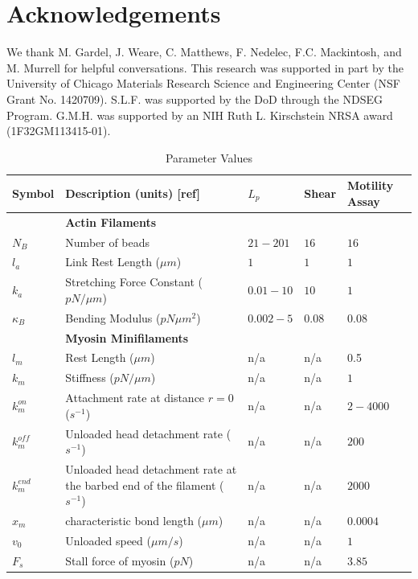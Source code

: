 \documentclass[12pt]{article}
\newcommand{\beginsupplement}{%
  \setcounter{table}{0}
  \renewcommand{\thetable}{S\arabic{table}}%
  \setcounter{figure}{0}
  \renewcommand{\thefigure}{S\arabic{figure}}%
}
\begin{document}
\section{Acknowledgements}  
We thank M. Gardel, J. Weare, C. Matthews, F. Nedelec, F.C. Mackintosh, and M. Murrell for helpful conversations. 
This research was supported in part by the
University of Chicago Materials Research Science and Engineering Center
(NSF Grant No. 1420709). S.L.F. was supported by the DoD
through the NDSEG Program. G.M.H. was supported by an NIH Ruth L. Kirschstein
NRSA award (1F32GM113415-01).



\beginsupplement
\begin{table}
  \caption{Parameter Values}
  \centering
  \begin{tabular}{|C{2cm}|L{7cm}|C{2cm}|C{2cm}|C{2cm}|}
    \hline\hline
    Symbol & Description (units) [ref] & $L_p$ & Shear & Motility Assay \\
    \hline
    &\bf{Actin Filaments}& & & \\
    \hline
    $N_B$ & Number of beads & $21-201$ & $16$ & $16$ \\
    $l_a$ & Link Rest Length ($\mu m$)\cite{odijk1983}& $1$ & $1$ &$1$\\
    $k_a$ & Stretching Force Constant ($pN/\mu m$) & $0.01-10$ & $10$ & $1$ \\
    $\kappa_B$ & Bending Modulus ($pN\mu m^2$)\cite{ott1993} & $0.002-5 $ & $0.08$ & $0.08$ \\
    \hline
    &\bf{Myosin Minifilaments}& & &\\
    \hline
    $l_m$ & Rest Length ($\mu m$)\cite{niederman1975} & n/a & n/a & 0.5 \\
    $k_m$ & Stiffness ($pN/\mu m$)& n/a & n/a & $1$ \\
    $k^{on}_m$ & Attachment rate at distance $r=0$ ($s^{-1}$)& n/a & n/a &$2-4000$ \\
    $k^{off}_m$ & Unloaded head detachment rate ($s^{-1}$)& n/a & n/a & $200$ \\
    $k^{end}_m$ & Unloaded head detachment rate at the barbed end of the filament ($s^{-1}$)& n/a & n/a &$2000$ \\
    $x_m$ & characteristic bond length ($\mu m$) \cite{stam2015}& n/a & n/a & $0.0004$\\
    $v_0$ & Unloaded speed ($\mu m/s$) \cite{kron1986}&  n/a & n/a & $1$ \\
    $F_s$ & Stall force of myosin ($pN$)\cite{veigel2003}& n/a & n/a & $3.85$ \\

\end{tabular}
\end{table}
\end{document}
